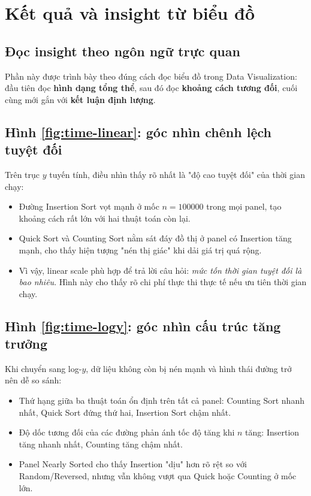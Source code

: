 \section{Kết quả và insight từ biểu đồ}

\subsection{Đọc insight theo ngôn ngữ trực quan}

Phần này được trình bày theo đúng cách đọc biểu đồ trong Data Visualization:
đầu tiên đọc \textbf{hình dạng tổng thể}, sau đó đọc \textbf{khoảng cách tương đối}, cuối cùng mới gắn với \textbf{kết luận định lượng}.

\subsection{Hình \ref{fig:time-linear}: góc nhìn chênh lệch tuyệt đối}

Trên trục $y$ tuyến tính, điều nhìn thấy rõ nhất là "độ cao tuyệt đối" của thời gian chạy:
\begin{itemize}[leftmargin=1.2cm]
    \item Đường Insertion Sort vọt mạnh ở mốc $n=100000$ trong mọi panel, tạo khoảng cách rất lớn với hai thuật toán còn lại.
    \item Quick Sort và Counting Sort nằm sát đáy đồ thị ở panel có Insertion tăng mạnh, cho thấy hiện tượng "nén thị giác" khi dải giá trị quá rộng.
    \item Vì vậy, linear scale phù hợp để trả lời câu hỏi: \textit{mức tốn thời gian tuyệt đối là bao nhiêu}. Hình này cho thấy rõ chi phí thực thi thực tế nếu ưu tiên thời gian chạy.
\end{itemize}

\subsection{Hình \ref{fig:time-logy}: góc nhìn cấu trúc tăng trưởng}

Khi chuyển sang log-$y$, dữ liệu không còn bị nén mạnh và hình thái đường trở nên dễ so sánh:
\begin{itemize}[leftmargin=1.2cm]
    \item Thứ hạng giữa ba thuật toán ổn định trên tất cả panel: Counting Sort nhanh nhất, Quick Sort đứng thứ hai, Insertion Sort chậm nhất.
    \item Độ dốc tương đối của các đường phản ánh tốc độ tăng khi $n$ tăng: Insertion tăng nhanh nhất, Counting tăng chậm nhất.
    \item Panel Nearly Sorted cho thấy Insertion "dịu" hơn rõ rệt so với Random/Reversed, nhưng vẫn không vượt qua Quick hoặc Counting ở mốc lớn.
\end{itemize}

